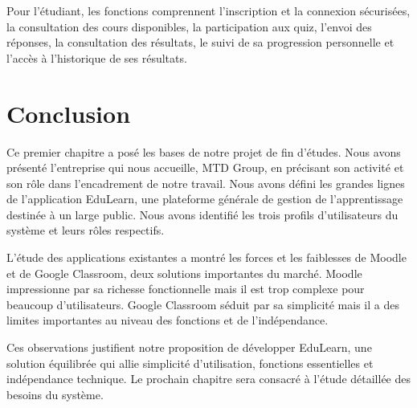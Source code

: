 \documentclass[12pt,a4paper]{report}
\begin{document}
Pour l'étudiant, les fonctions comprennent l'inscription et la connexion sécurisées, la consultation des cours disponibles, la participation aux quiz, l'envoi des réponses, la consultation des résultats, le suivi de sa progression personnelle et l'accès à l'historique de ses résultats.

\chapter{Conclusion}
Ce premier chapitre a posé les bases de notre projet de fin d'études. Nous avons présenté l'entreprise qui nous accueille, MTD Group, en précisant son activité et son rôle dans l'encadrement de notre travail. Nous avons défini les grandes lignes de l'application EduLearn, une plateforme générale de gestion de l'apprentissage destinée à un large public. Nous avons identifié les trois profils d'utilisateurs du système et leurs rôles respectifs.

L'étude des applications existantes a montré les forces et les faiblesses de Moodle et de Google Classroom, deux solutions importantes du marché. Moodle impressionne par sa richesse fonctionnelle mais il est trop complexe pour beaucoup d'utilisateurs. Google Classroom séduit par sa simplicité mais il a des limites importantes au niveau des fonctions et de l'indépendance.

Ces observations justifient notre proposition de développer EduLearn, une solution équilibrée qui allie simplicité d'utilisation, fonctions essentielles et indépendance technique. Le prochain chapitre sera consacré à l'étude détaillée des besoins du système.

\printbibliography
\end{document}
